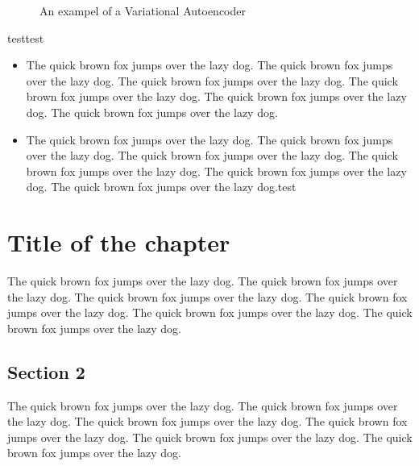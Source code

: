 \documentclass[11pt,a4paper]{report}
\begin{document}
\begin{figure}
\noindent{}
\caption{An exampel of a Variational Autoencoder}
  \label{fig:vae}
\end{figure}

testtest

\begin{itemize}
    \item The quick brown fox jumps over the lazy dog. The quick brown fox jumps over the lazy dog. The quick brown fox jumps over the lazy dog. The quick brown fox jumps over the lazy dog. The quick brown fox jumps over the lazy dog. The quick brown fox jumps over the lazy dog.
    \item The quick brown fox jumps over the lazy dog. The quick brown fox jumps over the lazy dog. The quick brown fox jumps over the lazy dog. The quick brown fox jumps over the lazy dog. The quick brown fox jumps over the lazy dog. The quick brown fox jumps over the lazy dog.test
\end{itemize}

\chapter{Title of the chapter}
\label{cap:name2}

The quick brown fox jumps over the lazy dog. The quick brown fox jumps over the lazy dog. The quick brown fox jumps over the lazy dog. The quick brown fox jumps over the lazy dog. The quick brown fox jumps over the lazy dog. The quick brown fox jumps over the lazy dog.

\section{Section 2}
\label{sec:sec2}

The quick brown fox jumps over the lazy dog. The quick brown fox jumps over the lazy dog. The quick brown fox jumps over the lazy dog. The quick brown fox jumps over the lazy dog. The quick brown fox jumps over the lazy dog. The quick brown fox jumps over the lazy dog.


\printbibliography[title={References}]
\end{document}
